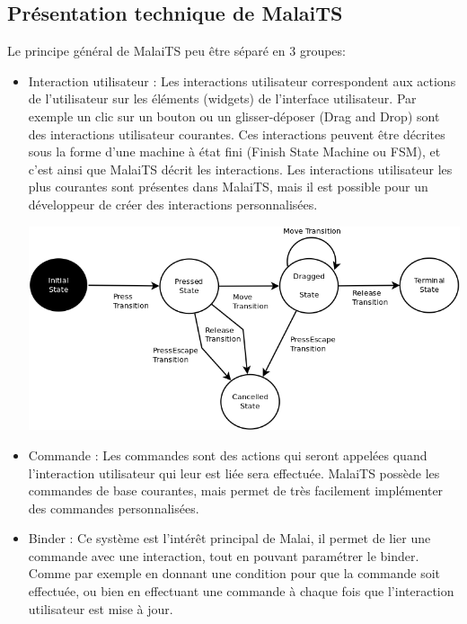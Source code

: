 \documentclass[11pt, a4paper, pdftex]{article}
\begin{document}
    \begin{appendices}
        \section{Présentation technique de MalaiTS}\label{sec:presmalaitech}
            Le principe général de MalaiTS peu être séparé en 3 groupes:
            \begin{itemize}
                \vspace{0.2cm}
                \item Interaction utilisateur : Les interactions utilisateur correspondent aux actions de l'utilisateur sur les éléments (widgets) de l'interface utilisateur.
                Par exemple un clic sur un bouton ou un glisser-déposer (Drag and Drop) sont des interactions utilisateur courantes.
                Ces interactions peuvent être décrites sous la forme d'une machine à état fini (Finish State Machine ou FSM), et c'est ainsi que MalaiTS décrit les interactions.
                Les interactions utilisateur les plus courantes sont présentes dans MalaiTS, mais il est possible pour un développeur de créer des interactions personnalisées. \par
                \vspace{0.5cm}
                    \begin{minipage}{\linewidth}
                        \centering
                        \includegraphics[height=6.0cm]{../assets/DnD.png}
                    \end{minipage}
                \vspace{0.5cm}
                \item Commande : Les commandes sont des actions qui seront appelées quand l'interaction utilisateur qui leur est liée sera effectuée.
                MalaiTS possède les commandes de base courantes, mais permet de très facilement implémenter des commandes personnalisées.
                \vspace{0.2cm}
                \item Binder : Ce système est l'intérêt principal de Malai, il permet de lier une commande avec une interaction, tout en pouvant paramétrer le binder.
                Comme par exemple en donnant une condition pour que la commande soit effectuée, ou bien en effectuant une commande à chaque fois que l'interaction utilisateur est mise à jour.
            \end{itemize}
        \newpage

\end{appendices}
\end{document}
